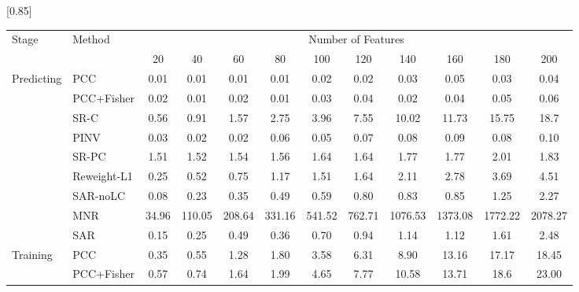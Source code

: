 \begin{table*}[htbp]
  \centering
  \vspace{0.2cm}
  \zhongwu
  \scalebox{0.85}[0.85]{
  \begin{tabular}{llcccccccccc}
  \toprule
  \multirow{2}{*}{Stage} & \multirow{2}{*}{Method} & \multicolumn{10}{c}{Number of Features} \\
  \cline{3-12}
   & & 20 & 40 & 60 & 80 & 100 & 120 & 140 & 160 & 180 & 200\\
  \midrule
  \multirow{7}{*}{Predicting} & PCC & 0.01 & 0.01 & 0.01 & 0.01 & 0.02 & 0.02 & 0.03 & 0.05 & 0.03 & 0.04 \\
  & PCC+Fisher & 0.02 & 0.01 & 0.02 & 0.01 & 0.03 & 0.04 & 0.02 & 0.04 & 0.05 & 0.06 \\
  & SR-C & 0.56 & 0.91 & 1.57 & 2.75 & 3.96 & 7.55 & 10.02 & 11.73 & 15.75 & 18.7\\
  & PINV & 0.03 & 0.02 & 0.02 & 0.06 & 0.05 & 0.07 & 0.08 & 0.09 & 0.08 & 0.10 \\
  & SR-PC & 1.51 & 1.52 & 1.54 & 1.56 & 1.64 & 1.64 & 1.77 & 1.77 & 2.01 & 1.83 \\
  & Reweight-L1 & 0.25 & 0.52 & 0.75 & 1.17 & 1.51 & 1.64 & 2.11 & 2.78 & 3.69 & 4.51 \\
  & SAR-noLC & 0.08 & 0.23 & 0.35 & 0.49 & 0.59 & 0.80 & 0.83 & 0.85 & 1.25 & 2.27 \\
  & \cellcolor[rgb]{.7,.8,.9}MNR & \cellcolor[rgb]{.7,.8,.9}34.96 & \cellcolor[rgb]{.7,.8,.9}110.05 & \cellcolor[rgb]{.7,.8,.9}208.64 & \cellcolor[rgb]{.7,.8,.9}331.16 & \cellcolor[rgb]{.7,.8,.9}541.52 & \cellcolor[rgb]{.7,.8,.9}762.71 & \cellcolor[rgb]{.7,.8,.9}1076.53 & \cellcolor[rgb]{.7,.8,.9}1373.08 & \cellcolor[rgb]{.7,.8,.9}1772.22 & \cellcolor[rgb]{.7,.8,.9}2078.27 \\
  & \cellcolor[rgb]{1,.9,.6}SAR & \cellcolor[rgb]{1,.9,.6}0.15 & \cellcolor[rgb]{1,.9,.6}0.25 & \cellcolor[rgb]{1,.9,.6}0.49 & \cellcolor[rgb]{1,.9,.6}0.36 & \cellcolor[rgb]{1,.9,.6}0.70 & \cellcolor[rgb]{1,.9,.6}0.94 & \cellcolor[rgb]{1,.9,.6}1.14 & \cellcolor[rgb]{1,.9,.6}1.12 & \cellcolor[rgb]{1,.9,.6}1.61 & \cellcolor[rgb]{1,.9,.6}2.48 \\
  \midrule
  \multirow{7}{*}{Training} & PCC & 0.35 & 0.55 & 1.28 & 1.80 & 3.58 & 6.31 & 8.90 & 13.16 & 17.17 & 18.45 \\
  & PCC+Fisher & 0.57 & 0.74 & 1.64 & 1.99 & 4.65 & 7.77 & 10.58 & 13.71 & 18.6 & 23.00 \\

\end{tabular}}
\end{table*}
